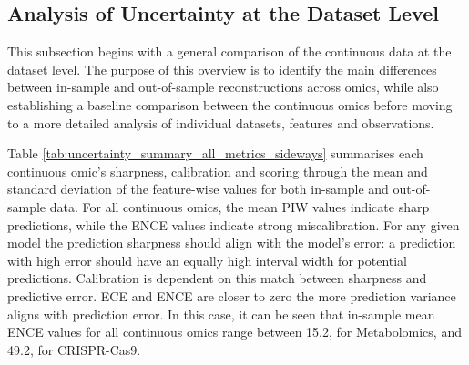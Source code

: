 
%
%
%
%


\subsection{Analysis of Uncertainty at the Dataset Level}\label{LSS_analysis_overview}


This subsection begins with a general comparison of the continuous data at the dataset level. The purpose of this overview is to identify the main differences between in-sample and out-of-sample reconstructions across omics, while also establishing a baseline comparison between the continuous omics before moving to a more detailed analysis of individual datasets, features and observations. 

Table \ref{tab:uncertainty_summary_all_metrics_sideways} summarises each continuous omic's sharpness, calibration and scoring through the mean and standard deviation of the feature-wise values for both in-sample and out-of-sample data. For all continuous omics, the mean PIW values indicate sharp predictions, while the ENCE values indicate strong miscalibration. For any given model the prediction sharpness should align with the model's error: a prediction with high error should have an equally high interval width for potential predictions. Calibration is dependent on this match between sharpness and predictive error. ECE and ENCE are closer to zero the more prediction variance aligns with prediction error. In this case, it can be seen that in-sample mean ENCE values for all continuous omics range between 15.2, for Metabolomics, and 49.2, for CRISPR-Cas9.

